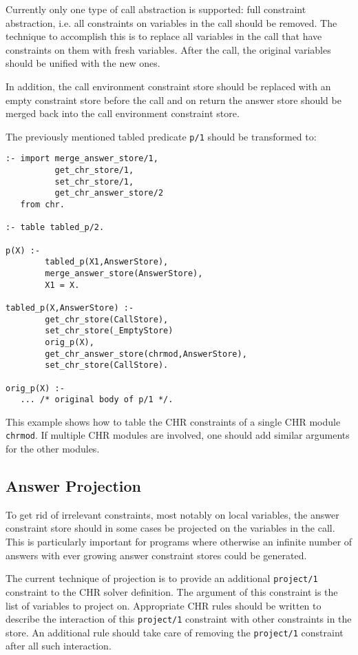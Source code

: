 Currently only one type of call abstraction is supported: full constraint
abstraction, i.e. all constraints on variables in the call should be
removed. The technique to accomplish this is to replace all variables in
the call that have constraints on them with fresh variables. After the call,
the original variables should be unified with the new ones.

In addition, the call environment constraint store should be replaced with an
empty constraint store before the call and on return the answer store should be merged
back into the call environment constraint store.

The previously mentioned tabled predicate \texttt{p/1} should be transformed
 to:

\begin{small}
\begin{verbatim}
:- import merge_answer_store/1, 
          get_chr_store/1,
          set_chr_store/1,
          get_chr_answer_store/2
   from chr.

:- table tabled_p/2.

p(X) :-
        tabled_p(X1,AnswerStore),
        merge_answer_store(AnswerStore),
        X1 = X.

tabled_p(X,AnswerStore) :-
        get_chr_store(CallStore),
        set_chr_store(_EmptyStore)
        orig_p(X),
        get_chr_answer_store(chrmod,AnswerStore),
        set_chr_store(CallStore).

orig_p(X) :-
   ... /* original body of p/1 */.
\end{verbatim}
\end{small}

This example shows how to table the CHR constraints of a single CHR module
\texttt{chrmod}. If multiple CHR modules are involved, one should add similar
arguments for the other modules.

\subsection{Answer Projection}

To get rid of irrelevant constraints, most notably on local variables, the answer
constraint store should in some cases be projected on the variables in the call.
This is particularly important for programs where otherwise an infinite number 
of answers with ever growing answer constraint stores could be generated.

The current technique of projection is to provide an additional \texttt{project/1}
constraint to the CHR solver definition. The argument of this constraint is
the list of variables to project on. Appropriate CHR rules should be written
to describe the interaction of this \texttt{project/1} constraint with other
constraints in the store. An additional rule should take care of removing
the \texttt{project/1} constraint after all such interaction.


